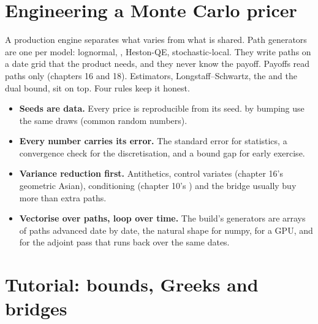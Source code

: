 \section{Engineering a Monte Carlo pricer}

A production engine separates what varies from what is shared. Path generators are one per model: lognormal, , Heston-QE,
stochastic-local. They write paths on a date grid that the product needs, and they never know the payoff. Payoffs read paths only (chapters 16 and
18). Estimators, Longstaff--Schwartz, the  and the dual bound, sit on top. Four rules keep it honest.
\begin{itemize}
\item \textbf{Seeds are data.} Every price is reproducible from its seed.  by bumping use the same draws (common random numbers).
\item \textbf{Every number carries its error.} The standard error for statistics, a convergence check for the discretisation, and a bound gap for early
exercise.
\item \textbf{Variance reduction first.} Antithetics, control variates (chapter 16's geometric Asian), conditioning (chapter 10's ) and
the bridge usually buy more than extra paths.
\item \textbf{Vectorise over paths, loop over time.} The build's generators are arrays of paths advanced date by date, the natural shape for numpy, for
a GPU, and for the adjoint pass that runs back over the same dates.
\end{itemize}

\section{Tutorial: bounds, Greeks and bridges}\label{tut:dv:monte-carlo-pricers-in-practice:tut}

